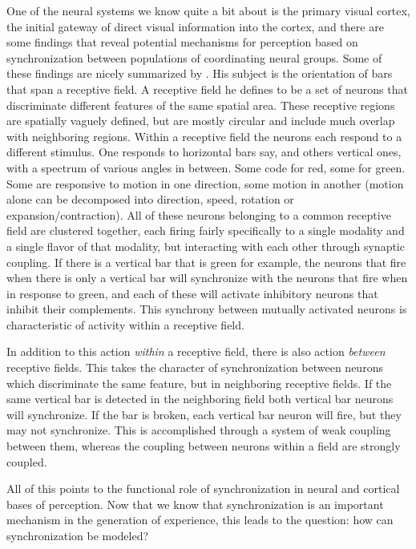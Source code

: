 \documentclass[12pt]{article}
\begin{document}
One of the neural systems we know quite a bit about is the primary visual cortex, the initial gateway of direct visual information into the cortex, and there are some findings that reveal potential mechanisms for perception based on synchronization between populations of coordinating neural groups.  Some of these findings are nicely summarized by \cite{Sompolinsky}.  His subject is the orientation of bars that span a receptive field.  A receptive field he defines to be a set of neurons that discriminate different features of the same spatial area.  These receptive regions are spatially vaguely defined, but are mostly circular and include much overlap with neighboring regions.  Within a receptive field the neurons each respond to a different stimulus.  One responds to horizontal bars say, and others vertical ones, with a spectrum of various angles in between.  Some code for red, some for green.  Some are responsive to motion in one direction, some motion in another (motion alone can be decomposed into direction, speed, rotation or expansion/contraction).  All of these neurons belonging to a common receptive field are clustered together, each firing fairly specifically to a single modality and a single flavor of that modality, but interacting with each other through synaptic coupling.  If there is a vertical bar that is green for example, the neurons that fire when there is only a vertical bar will synchronize with the neurons that fire when in response to green, and each of these will activate inhibitory neurons that inhibit their complements.   This synchrony between mutually activated neurons is characteristic of activity within a receptive field.  

In addition to this action {\em within} a receptive field, there is also action {\em between} receptive fields.  This takes the character of synchronization between neurons which discriminate the same feature, but in neighboring receptive fields.  If the same vertical bar is detected in the neighboring field both vertical bar neurons will synchronize.  If the bar is broken, each vertical bar neuron will fire, but they may not synchronize.  This is accomplished through a system of weak coupling between them, whereas the coupling between neurons within a field are strongly coupled.  

All of this points to the functional role of synchronization in neural and cortical bases of perception.  Now that we know that synchronization is an important mechanism in the generation of experience, this leads to the question: how can synchronization be modeled?
\end{document}
